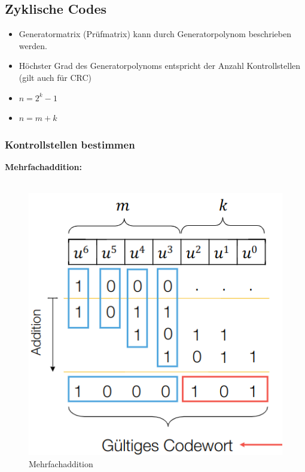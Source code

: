 \subsection{Zyklische Codes}
\begin{itemize}
	\item Generatormatrix (Prüfmatrix) kann durch Generatorpolynom beschrieben werden.
	\item Höchster Grad des Generatorpolynoms entspricht der Anzahl Kontrollstellen (gilt auch für CRC)
	\item $n=2^k-1$
	\item $n=m+k$
\end{itemize}

\subsubsection{Kontrollstellen bestimmen}
\textbf{Mehrfachaddition:} \\
\\
\begin{figure}[h!]
	\centering
	\begin{minipage}[t]{0.4\textwidth}
		\centering
		\includegraphics[width=0.9\linewidth]{images/mehrfachaddition}
		\caption{Mehrfachaddition}
		\label{fig:mehrfachaddition}
	\end{minipage}
\end{figure}

